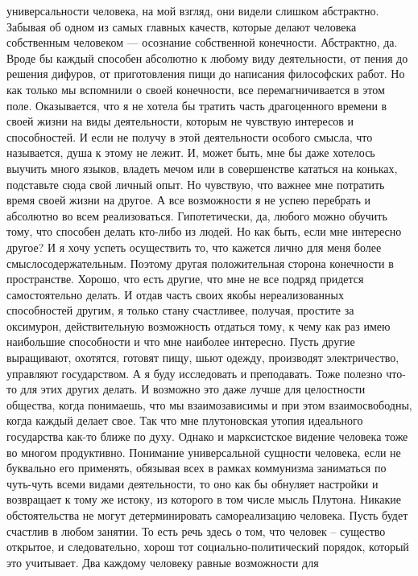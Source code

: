 универсальности человека, на мой взгляд, они видели слишком абстрактно. Забывая
об одном из самых главных качеств, которые делают человека собственным человеком
— осознание собственной конечности. Абстрактно, да. Вроде бы каждый способен
абсолютно к любому виду деятельности, от пения до решения дифуров, от
приготовления пищи до написания философских работ. Но как только мы вспомнили о
своей конечности, все перемагничивается в этом поле. Оказывается, что я не
хотела бы тратить часть драгоценного времени в своей жизни на виды деятельности,
которым не чувствую интересов и способностей. И если не получу в этой
деятельности особого смысла, что называется, душа к этому не лежит. И, может
быть, мне бы даже хотелось выучить много языков, владеть мечом или в
совершенстве кататься на коньках, подставьте сюда свой личный опыт. Но чувствую,
что важнее мне потратить время своей жизни на другое. А все возможности я не
успею перебрать и абсолютно во всем реализоваться. Гипотетически, да, любого
можно обучить тому, что способен делать кто-либо из людей. Но как быть, если мне
интересно другое? И я хочу успеть осуществить то, что кажется лично для меня
более смыслосодержательным. Поэтому другая положительная сторона конечности в
пространстве. Хорошо, что есть другие, что мне не все подряд придется
самостоятельно делать. И отдав часть своих якобы нереализованных способностей
другим, я только стану счастливее, получая, простите за оксимурон,
действительную возможность отдаться тому, к чему как раз имею наибольшие
способности и что мне наиболее интересно. Пусть другие выращивают, охотятся,
готовят пищу, шьют одежду, производят электричество, управляют государством. А я
буду исследовать и преподавать. Тоже полезно что-то для этих других делать. И
возможно это даже лучше для целостности общества, когда понимаешь, что мы
взаимозависимы и при этом взаимосвободны, когда каждый делает свое. Так что мне
плутоновская утопия идеального государства как-то ближе по духу. Однако и
марксистское видение человека тоже во многом продуктивно. Понимание
универсальной сущности человека, если не буквально его применять, обязывая всех
в рамках коммунизма заниматься по чуть-чуть всеми видами деятельности, то оно
как бы обнуляет настройки и возвращает к тому же истоку, из которого в том числе
мысль Плутона. Никакие обстоятельства не могут детерминировать самореализацию
человека. Пусть будет счастлив в любом занятии. То есть речь здесь о том, что
человек – существо открытое, и следовательно, хорош тот социально-политический
порядок, который это учитывает. Два каждому человеку равные возможности для
